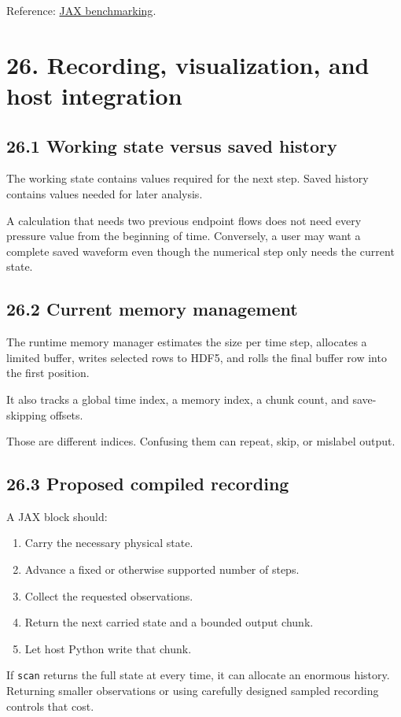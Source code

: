 \documentclass[11pt,a4paper]{article}
\begin{document}
Reference: \href{https://docs.jax.dev/en/latest/benchmarking.html}{JAX benchmarking}.

\clearpage
\section{26. Recording, visualization, and host integration}
\subsection{26.1 Working state versus saved history}
The working state contains values required for the next step. Saved history contains values needed for later analysis.

A calculation that needs two previous endpoint flows does not need every pressure value from the beginning of time. Conversely, a user may want a complete saved waveform even though the numerical step only needs the current state.

\subsection{26.2 Current memory management}
The runtime memory manager estimates the size per time step, allocates a limited buffer, writes selected rows to HDF5, and rolls the final buffer row into the first position.

It also tracks a global time index, a memory index, a chunk count, and save-skipping offsets.

Those are different indices. Confusing them can repeat, skip, or mislabel output.

\subsection{26.3 Proposed compiled recording}
A JAX block should:


\begin{enumerate}
\item Carry the necessary physical state.


\item Advance a fixed or otherwise supported number of steps.


\item Collect the requested observations.


\item Return the next carried state and a bounded output chunk.


\item Let host Python write that chunk.


\end{enumerate}
If \texttt{scan} returns the full state at every time, it can allocate an enormous history. Returning smaller observations or using carefully designed sampled recording controls that cost.
\end{document}
